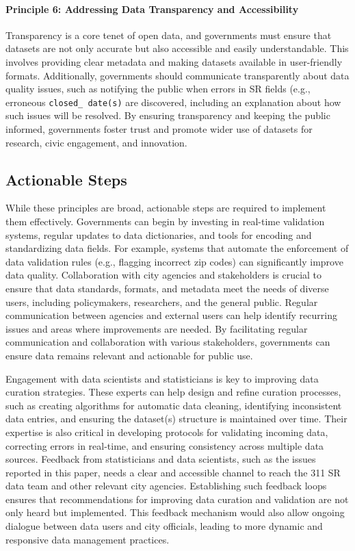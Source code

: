 \documentclass[linenumber]{jdsart}
\begin{document}
\paragraph{Principle 6: Addressing Data Transparency and Accessibility}
Transparency is a core tenet of open data, and governments must ensure 
that datasets are not only accurate but also accessible and easily 
understandable. This involves providing clear metadata and making 
datasets available in user\mbox{-}friendly formats. Additionally, 
governments should communicate transparently about 
data quality issues, such as notifying the public when errors in SR 
fields (e.g., erroneous \texttt{closed\_ date(s)} are discovered, including
an explanation about how such issues will be resolved. By 
ensuring transparency and keeping the public informed, 
governments foster trust and promote wider use of datasets 
for research, civic engagement, and innovation.


\subsection{Actionable Steps}
While these principles are broad, actionable steps are required to 
implement them effectively. Governments can begin by investing in 
real\mbox{-}time validation systems, regular updates to data dictionaries, 
and tools for encoding and standardizing data fields. For example, 
systems that automate the enforcement of data validation rules 
(e.g., flagging incorrect zip codes) can significantly improve data 
quality. Collaboration with city agencies and stakeholders is crucial 
to ensure that data standards, formats, and metadata meet the needs 
of diverse users, including policymakers, researchers, and the 
general public. Regular communication between agencies and external 
users can help identify recurring issues and areas where improvements 
are needed. By facilitating regular communication and collaboration 
with various stakeholders, governments can ensure data remains relevant 
and actionable for public use.


Engagement with data scientists and statisticians is key to improving 
data curation strategies. These experts can help design and refine 
curation processes, such as creating algorithms for automatic data 
cleaning, identifying inconsistent data entries, and ensuring the 
dataset(s) structure is maintained over time. Their expertise is also 
critical in developing protocols for validating incoming data, correcting 
errors in real\mbox{-}time, and ensuring consistency across multiple data sources. 
Feedback from statisticians and data scientists, such as the issues reported 
in this paper, needs a clear and accessible channel to reach the 311 SR data 
team and other relevant city agencies. Establishing such feedback loops 
ensures that recommendations for improving data curation and validation 
are not only heard but implemented. This feedback mechanism would also allow 
ongoing dialogue between data users and city officials, leading to more dynamic 
and responsive data management practices.
\end{document}

